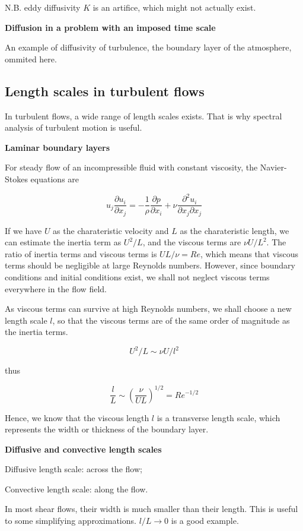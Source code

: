 N.B. eddy diffusivity $K$ is an artifice, which might not actually exist.

\textbf{Diffusion in a problem with an imposed time scale}

An example of diffusivity of turbulence, the boundary layer of the atmosphere, ommited here.

\subsection{Length scales in turbulent flows}

In turbulent flows, a wide range of length scales exists. That is why spectral analysis of turbulent motion is useful.

\textbf{Laminar boundary layers}

For steady flow of an incompressible fluid with constant viscosity, the Navier-Stokes equations are

\begin{equation*}
    u_j\frac{\partial u_i}{\partial x_j}=-\frac{1}{\rho}\frac{\partial p}{\partial x_i}+\nu\frac{\partial^2 u_i}{\partial x_j\partial x_j}
\end{equation*}

If we have $U$ as the charateristic velocity and $L$ as the charateristic length, we can estimate the inertia term as $U^2/L$, and the viscous terms are $\nu U/L^2$.
The ratio of inertia terms and viscous terms is $UL/\nu=Re$, which means that viscous terms should be negligible at large Reynolds numbers.
However, since boundary conditions and initial conditions exist, we shall not neglect viscous terms everywhere in the flow field.

As viscous terms can survive at high Reynolds numbers, we shall choose a new length scale $l$, so that the viscous terms are of the same order of magnitude as the inertia terms.

\begin{equation*}
    U^2/L\sim\nu U/l^2
\end{equation*}

thus

\begin{equation*}
    \frac{l}{L}\sim\left(\frac{\nu}{UL}\right)^{1/2}=Re^{-1/2}
\end{equation*}

Hence, we know that the viscous length $l$ is a transverse length scale, which represents the width or thickness of the boundary layer.

\textbf{Diffusive and convective length scales}

Diffusive length scale: across the flow;

Convective length scale: along the flow.

In most shear flows, their width is much smaller than their length. This is useful to some simplifying approximations. $l/L\rightarrow 0$ is a good example.




